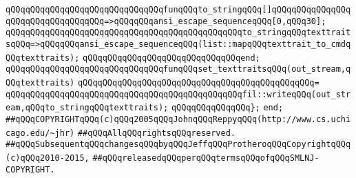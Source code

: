 \newline
\verb|qQQqqQQqqQQqqQQqqQQqqQQqqQQqqQQqfunqQQqto_stringqQQq[]qQQqqQQqqQQqqQQqqQQqqQQqqQQqqQQqqQQq=>qQQqqQQqansi_escape_sequenceqQQq[0,qQQq30];|\newline
\verb|qQQqqQQqqQQqqQQqqQQqqQQqqQQqqQQqqQQqqQQqqQQqqQQqto_stringqQQqtexttraitsqQQq=>qQQqqQQqansi_escape_sequenceqQQq(list::mapqQQqtexttrait_to_cmdqQQqtexttraits);|\newline
\verb|qQQqqQQqqQQqqQQqqQQqqQQqqQQqqQQqend;|\newline
\newline
\verb|qQQqqQQqqQQqqQQqqQQqqQQqqQQqqQQqfunqQQqset_texttraitsqQQq(out_stream,qQQqtexttraits)|\newline
\verb|qQQqqQQqqQQqqQQqqQQqqQQqqQQqqQQqqQQqqQQqqQQqqQQq=|\newline
\verb|qQQqqQQqqQQqqQQqqQQqqQQqqQQqqQQqqQQqqQQqqQQqqQQqfil::writeqQQq(out_stream,qQQqto_stringqQQqtexttraits);|\newline
\newline
\verb|qQQqqQQqqQQqqQQq};|\newline
\verb|end;|\newline
\newline
\verb|##qQQqCOPYRIGHTqQQq(c)qQQq2005qQQqJohnqQQqReppyqQQq(http://www.cs.uchicago.edu/~jhr)|\newline
\verb|##qQQqAllqQQqrightsqQQqreserved.|\newline
\verb|##qQQqSubsequentqQQqchangesqQQqbyqQQqJeffqQQqProtheroqQQqCopyrightqQQq(c)qQQq2010-2015,|\newline
\verb|##qQQqreleasedqQQqperqQQqtermsqQQqofqQQqSMLNJ-COPYRIGHT.|\newline


